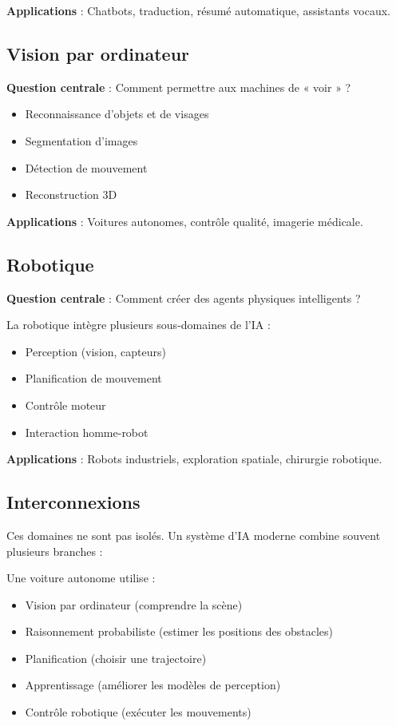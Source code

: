 \documentclass[11pt,a4paper]{article}
\begin{document}
\textbf{Applications} : Chatbots, traduction, résumé automatique, assistants vocaux.

\subsection{Vision par ordinateur}

\textbf{Question centrale} : Comment permettre aux machines de « voir » ?

\begin{itemize}
    \item Reconnaissance d'objets et de visages
    \item Segmentation d'images
    \item Détection de mouvement
    \item Reconstruction 3D
\end{itemize}

\textbf{Applications} : Voitures autonomes, contrôle qualité, imagerie médicale.

\subsection{Robotique}

\textbf{Question centrale} : Comment créer des agents physiques intelligents ?

La robotique intègre plusieurs sous-domaines de l'IA :
\begin{itemize}
    \item Perception (vision, capteurs)
    \item Planification de mouvement
    \item Contrôle moteur
    \item Interaction homme-robot
\end{itemize}

\textbf{Applications} : Robots industriels, exploration spatiale, chirurgie robotique.

\subsection{Interconnexions}

Ces domaines ne sont pas isolés. Un système d'IA moderne combine souvent plusieurs branches :

\begin{exemplebox}
Une voiture autonome utilise :
\begin{itemize}
    \item Vision par ordinateur (comprendre la scène)
    \item Raisonnement probabiliste (estimer les positions des obstacles)
    \item Planification (choisir une trajectoire)
    \item Apprentissage (améliorer les modèles de perception)
    \item Contrôle robotique (exécuter les mouvements)
\end{itemize}
\end{exemplebox}
\end{document}
